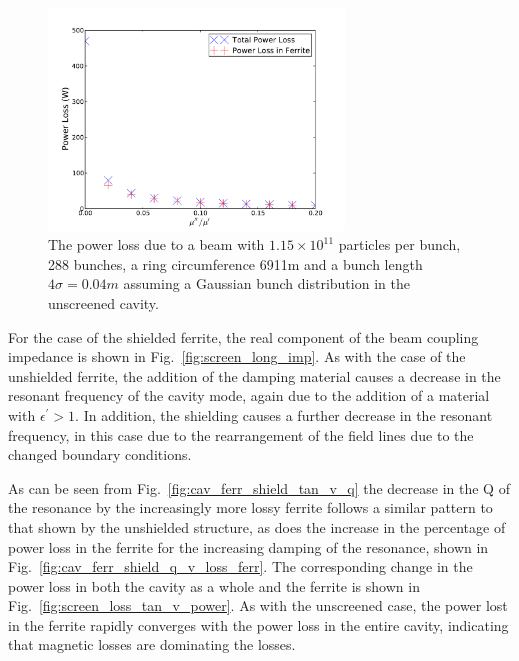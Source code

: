 \begin{figure}
\begin{center}
\includegraphics[width=0.7\textwidth]{Beam_Coupling_Impedance_Reduction_Techniques/figures/no_screen_loss_tan_vs_power.pdf}
\end{center}
\caption{The power loss due to  a beam with $1.15 \times 10^{11}$ particles per bunch, 288 bunches, a ring circumference 6911m and a bunch length $4\sigma = 0.04m$ assuming a Gaussian bunch distribution in the unscreened cavity.}
\label{fig:no_screen_loss_tan_v_power}
\end{figure}

For the case of the shielded ferrite, the real component of the beam coupling impedance is shown in Fig.~\ref{fig:screen_long_imp}. As with the case of the unshielded ferrite, the addition of the damping material causes a decrease in the resonant frequency of the cavity mode, again due to the addition of a material with $\epsilon^{'} > 1$. In addition, the shielding causes a further decrease in the resonant frequency, in this case due to the rearrangement of the field lines due to the changed boundary conditions.

As can be seen from Fig.~\ref{fig:cav_ferr_shield_tan_v_q} the decrease in the Q of the resonance by the increasingly more lossy ferrite follows a similar pattern to that shown by the unshielded structure, as does the increase in the percentage of power loss in the ferrite for the increasing damping of the resonance, shown in Fig.~\ref{fig:cav_ferr_shield_q_v_loss_ferr}. The corresponding change in the power loss in both the cavity as a whole and the ferrite is shown in Fig.~\ref{fig:screen_loss_tan_v_power}. As with the unscreened case, the power lost in the ferrite rapidly converges with the power loss in the entire cavity, indicating that magnetic losses are dominating the losses.	

